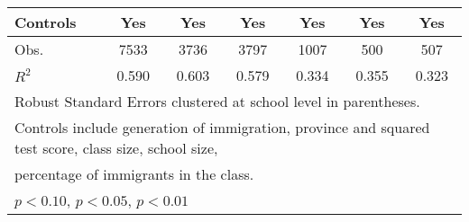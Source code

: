 \begin{table}[htbp]
\begin{tabular}{l*{6}{c}}
Controls            &         Yes         &         Yes         &         Yes         &         Yes         &         Yes         &         Yes         \\
\midrule
Obs.                &        7533         &        3736         &        3797         &        1007         &         500         &         507         \\
\(R^{2}\)           &       0.590         &       0.603         &       0.579         &       0.334         &       0.355         &       0.323         \\
\bottomrule
\multicolumn{7}{l}{\footnotesize Robust Standard Errors clustered at school level in parentheses.}\\
\multicolumn{7}{l}{\footnotesize Controls include generation of immigration, province and squared test score, class size, school size,}\\
\multicolumn{7}{l}{\footnotesize percentage of immigrants in the class.}\\
\multicolumn{7}{l}{\footnotesize \sym{*} \(p<0.10\), \sym{**} \(p<0.05\), \sym{***} \(p<0.01\)}\\
\end{tabular}
\end{table}

